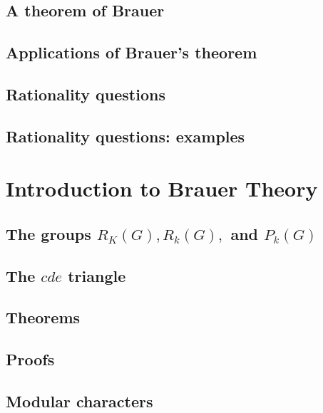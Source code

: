 \documentclass[oneside]{amsbook}
\begin{document}
\chapter{A theorem of Brauer}


\chapter{Applications of Brauer's theorem}


\chapter{Rationality questions}


\chapter{Rationality questions: examples}


\part{Introduction to Brauer Theory}
\chapter{The groups $R_K(G), R_k(G),$ and $P_k(G)$}


\chapter{The $cde$ triangle}


\chapter{Theorems}


\chapter{Proofs}


\chapter{Modular characters}

\end{document}
